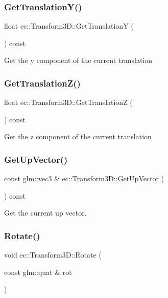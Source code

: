 \subsubsection{\texorpdfstring{Get\+Translation\+Y()}{GetTranslationY()}}
{\footnotesize\ttfamily float ec\+::\+Transform3\+D\+::\+Get\+TranslationY (\begin{DoxyParamCaption}{ }\end{DoxyParamCaption}) const}

Get the y component of the current translation \mbox{\label{classec_1_1_transform3_d_a85f04530ab18f8266e8741eca1e69315}} 
\subsubsection{\texorpdfstring{Get\+Translation\+Z()}{GetTranslationZ()}}
{\footnotesize\ttfamily float ec\+::\+Transform3\+D\+::\+Get\+TranslationZ (\begin{DoxyParamCaption}{ }\end{DoxyParamCaption}) const}

Get the z component of the current translation \mbox{\label{classec_1_1_transform3_d_ace4e850baa2cbbbbcbe12613eb6851a8}} 
\subsubsection{\texorpdfstring{Get\+Up\+Vector()}{GetUpVector()}}
{\footnotesize\ttfamily const glm\+::vec3 \& ec\+::\+Transform3\+D\+::\+Get\+Up\+Vector (\begin{DoxyParamCaption}{ }\end{DoxyParamCaption}) const}

Get the current up vector. \mbox{\label{classec_1_1_transform3_d_ae2675da2f17fe145cc199412d85777d5}} 
\subsubsection{\texorpdfstring{Rotate()}{Rotate()}\hspace{0.1cm}{\footnotesize\ttfamily [1/2]}}
{\footnotesize\ttfamily void ec\+::\+Transform3\+D\+::\+Rotate (\begin{DoxyParamCaption}\item[{const glm\+::quat \&}]{rot }\end{DoxyParamCaption})}

